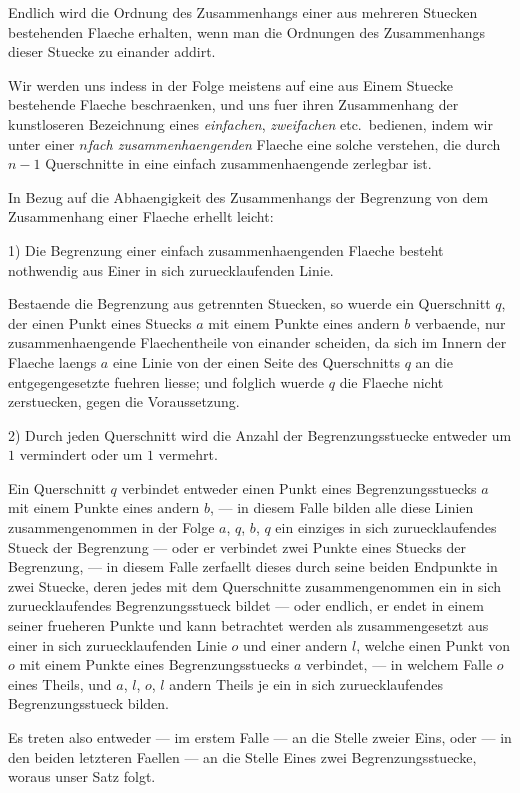 \documentclass[12pt,a4paper]{book}
\theoremstyle{definition}
\theoremstyle{remark}
\begin{document}
Endlich wird die Ordnung des Zusammenhangs einer aus mehreren Stuecken bestehenden Flaeche erhalten, wenn man die Ordnungen des Zusammenhangs dieser Stuecke zu einander addirt.

Wir werden uns indess in der Folge meistens auf eine aus Einem Stuecke bestehende Flaeche beschraenken, und uns fuer ihren Zusammenhang der kunstloseren Bezeichnung eines \emph{einfachen}, \emph{zweifachen} etc.\ bedienen, indem wir unter einer \emph{$n$fach zusammenhaengenden} Flaeche eine solche verstehen, die durch $n - 1$ Querschnitte in eine einfach zusammenhaengende zerlegbar ist.

In Bezug auf die Abhaengigkeit des Zusammenhangs der Begrenzung von dem Zusammenhang einer Flaeche erhellt leicht:

1) Die Begrenzung einer einfach zusammenhaengenden Flaeche besteht nothwendig aus Einer in sich zuruecklaufenden Linie.

Bestaende die Begrenzung aus getrennten Stuecken, so wuerde ein Querschnitt $q$, der einen Punkt eines Stuecks $a$ mit einem Punkte eines andern $b$ verbaende, nur zusammenhaengende Flaechentheile von einander scheiden, da sich im Innern der Flaeche laengs $a$ eine Linie von der einen Seite des Querschnitts $q$ an die entgegengesetzte fuehren liesse; und folglich wuerde $q$ die Flaeche nicht zerstuecken, gegen die Voraussetzung.

2) Durch jeden Querschnitt wird die Anzahl der Begrenzungsstuecke entweder um $1$ vermindert oder um $1$ vermehrt.

Ein Querschnitt $q$ verbindet entweder einen Punkt eines Begrenzungsstuecks $a$ mit einem Punkte eines andern $b$, --- in diesem Falle bilden alle diese Linien zusammengenommen in der Folge $a$, $q$, $b$, $q$ ein einziges in sich zuruecklaufendes Stueck der Begrenzung --- oder er verbindet zwei Punkte eines Stuecks der Begrenzung, --- in diesem Falle zerfaellt dieses durch seine beiden Endpunkte in zwei Stuecke, deren jedes mit dem Querschnitte zusammengenommen ein in sich zuruecklaufendes Begrenzungsstueck bildet --- oder endlich, er endet in einem seiner frueheren Punkte und kann betrachtet werden als zusammengesetzt aus einer in sich zuruecklaufenden Linie $o$ und einer andern $l$, welche einen Punkt von $o$ mit einem Punkte eines Begrenzungsstuecks $a$ verbindet, --- in welchem Falle $o$ eines Theils, und $a$, $l$, $o$, $l$ andern Theils je ein in sich zuruecklaufendes Begrenzungsstueck bilden.

Es treten also entweder --- im erstem Falle --- an die Stelle zweier Eins, oder --- in den beiden letzteren Faellen --- an die Stelle Eines zwei Begrenzungsstuecke, woraus unser Satz folgt.
\end{document}
